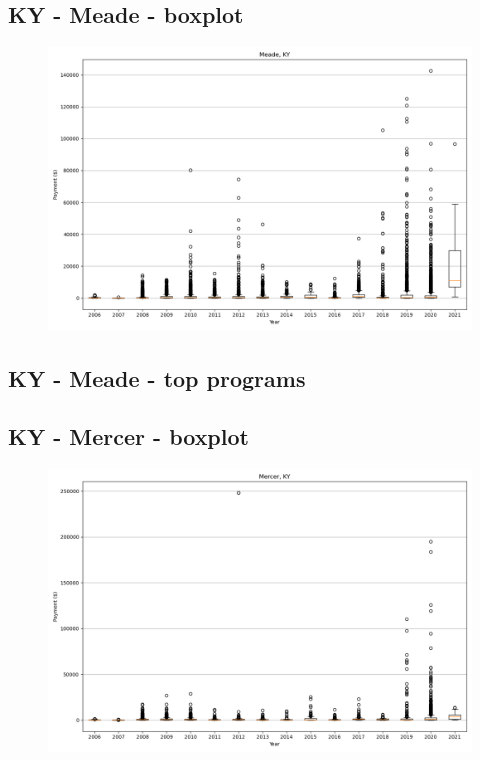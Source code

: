\subsection*{KY - Meade - boxplot}
\begin{figure}[h]
\centering
\includegraphics[width=7in]{../output/boxplots/counties/Meade-KY_boxplot.png}
\end{figure}


\subsection*{KY - Meade - top programs}

\newpage
\subsection*{KY - Mercer - boxplot}
\begin{figure}[h]
\centering
\includegraphics[width=7in]{../output/boxplots/counties/Mercer-KY_boxplot.png}
\end{figure}


